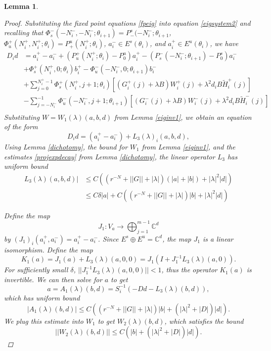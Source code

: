 \documentclass[12pt]{article}
\def\C{{\mathbb C}}
\newtheorem{lemma}{Lemma}
\begin{document}
\begin{lemma}
\begin{proof}
Substituting the fixed point equations \eqref{fpeig} into equation \eqref{eigsystem2} and recalling that $\Phi_s^-(-N_i^-, -N_i^-; \theta_{i+1}) = P_-^s(-N_i^-; \theta_{i+1}$, $\Phi_u^+(N_i^+, N_i^+; \theta_i) = P_+^u(N_i^+; \theta_{i})$, $a_i^- \in E^s(\theta_i)$, and $a_i^+ \in E^u(\theta_i)$, we have
\begin{align}
D_i d &= a_i^+ - a_i^- + (P_u^+(N_i^+; \theta_i) - P_0^u) a_i^+ - (P_s^-(-N_i^-; \theta_{i+1}) - P_0^s) a_i^- \\
&+ \Phi_s^+(N_i^+, 0; \theta_i) b_i^+ - \Phi_u^-(-N_i^-, 0; \theta_{i+1}) b_i^- \nonumber \\
&+ \sum_{j = 0}^{N_i^+-1} \Phi_s^+(N_i^+, j+1; \theta_i) 
[(G_i^+(j) + \lambda B) W_i^+(j) + \lambda^2 d_i B \tilde{H}_i^+(j)] \nonumber \\
&- \sum_{j = -N_i^-}^{-1} \Phi_u^-(-N_i^-, j+1; \theta_{i+1}) 
[(G_i^-(j) + \lambda B) W_i^-(j) + \lambda^2 d_i B \tilde{H}_i^-(j)] \nonumber \\
\end{align}
Substituting $W = W_1(\lambda)(a, b, d)$ from Lemma \ref{eiginv1}, we obtain an equation of the form 
\begin{equation}\label{Dideq2}
D_i d = (a_i^+ - a_i^-) + L_3(\lambda)_i(a,b,d),
\end{equation}
Using Lemma \ref{dichotomy}, the bound for $W_1$ from Lemma \ref{eiginv1}, and the estimates \eqref{projexpdecay} from Lemma \ref{dichotomy}, the linear operator $L_3$ has uniform bound
\begin{align}\label{L3bound}
L_3(\lambda)(a,b,d)| &\leq C\left( (r^{-N} + ||G|| + |\lambda| ) (|a| + |b|) + |\lambda|^2 |d|  \right) \\
&\leq C \delta |a| + C\left( (r^{-N} + ||G|| + |\lambda| ) |b| + |\lambda|^2 |d|  \right) \nonumber
\end{align}

Define the map
\[
J_1: V_a \rightarrow \bigoplus_{j=1}^{m-1} \C^d
\]
by $(J_1)_i(a_i^+, a_i^-) = a_i^+ - a_i^-$. Since $E^s \oplus E^u = \C^d$, the map $J_1$ is a linear isomorphism. Define the map
\[
K_1(a) = J_1 (a) + L_3(\lambda)(a, 0, 0) = J_1( I + J_1^{-1} L_3(\lambda)(a, 0) ).
\]
For sufficiently small $\delta$, $||J_1^{-1} L_3(\lambda)(a, 0, 0)|| < 1$, thus the operator $K_1(a)$ is invertible. We can then solve for $a$ to get
\[
a = A_1(\lambda)(b, d) = S_i^{-1}(-D d - L_3(\lambda)(b, d)),
\]
which has uniform bound
\begin{equation*}
|A_1(\lambda)(b, d)| \leq C \left( (r^{-N} + ||G|| + |\lambda| ) |b| + (|\lambda|^2 + |D| ) |d|  \right).
\end{equation*}
We plug this estimate into $W_1$ to get $W_2(\lambda)(b,d)$, which satisfies the bound
\begin{equation*}
||W_2(\lambda)(b,d)|| \leq C \left( |b| + (|\lambda|^2 + |D|) |d| \right).
\end{equation*}


\end{proof}
\end{lemma}
\end{document}
